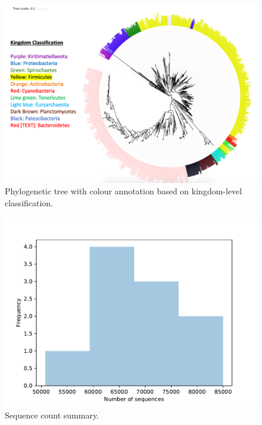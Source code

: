 \documentclass{singlecol-new}
\theoremstyle{TH}{
\newtheorem{lemma}{Lemma}
\newtheorem{theorem}[lemma]{Theorem}
\newtheorem{corrolary}[lemma]{Corrolary}
\newtheorem{conjecture}[lemma]{Conjecture}
\newtheorem{proposition}[lemma]{Proposition}
\newtheorem{claim}[lemma]{Claim}
\newtheorem{stheorem}[lemma]{Wrong Theorem}
\newtheorem{algorithm}{Algorithm}
}
\theoremstyle{THrm}{
\newtheorem{definition}{Definition}[section]
\newtheorem{question}{Question}[section]
\newtheorem{remark}{Remark}
\newtheorem{scheme}{Scheme}
}
\theoremstyle{THhit}{
\newtheorem{case}{Case}[section]
}
\begin{document}
\begin{figure}[htbp]
\centerline{\includegraphics[scale=0.2]{figures/phylogenetic-tree-final.png}}
\caption{Phylogenetic tree with colour annotation based on kingdom-level classification.}
\label{fig. 7}
\end{figure}

\begin{figure}[htbp]
\centerline{\includegraphics[scale=0.6]{figures/demultiplex-summary.pdf}}
\caption{Sequence count summary.}
\label{fig. 8}
\end{figure}
\end{document}

